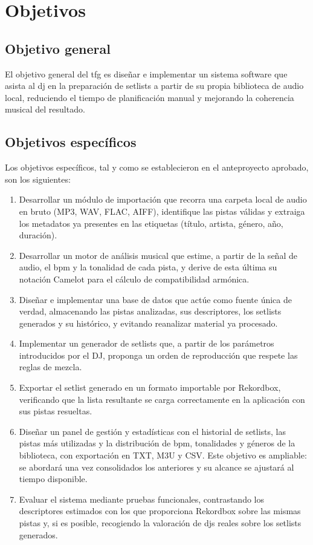 \section{Objetivos}
\label{sec:intro-objetivos}

\subsection{Objetivo general}

El objetivo general del \acs{tfg} es diseñar e implementar un sistema software que asista al \acs{dj} en la preparación de setlists a partir de su propia biblioteca de audio local, reduciendo el tiempo de planificación manual y mejorando la coherencia musical del resultado.

\subsection{Objetivos específicos}

Los objetivos específicos, tal y como se establecieron en el anteproyecto aprobado, son los siguientes:

\begin{enumerate}[label=\textbf{O\arabic*.}, leftmargin=*]
  \item Desarrollar un módulo de importación que recorra una carpeta local de audio en bruto (MP3, WAV, FLAC, AIFF), identifique las pistas válidas y extraiga los metadatos ya presentes en las etiquetas (título, artista, género, año, duración).
  \item Desarrollar un motor de análisis musical que estime, a partir de la señal de audio, el \acs{bpm} y la tonalidad de cada pista, y derive de esta última su notación Camelot para el cálculo de compatibilidad armónica.
  \item Diseñar e implementar una base de datos que actúe como fuente única de verdad, almacenando las pistas analizadas, sus descriptores, los setlists generados y su histórico, y evitando reanalizar material ya procesado.
  \item Implementar un generador de setlists que, a partir de los parámetros introducidos por el DJ, proponga un orden de reproducción que respete las reglas de mezcla.
  \item Exportar el setlist generado en un formato importable por Rekordbox, verificando que la lista resultante se carga correctamente en la aplicación con sus pistas resueltas.
  \item Diseñar un panel de gestión y estadísticas con el historial de setlists, las pistas más utilizadas y la distribución de \acs{bpm}, tonalidades y géneros de la biblioteca, con exportación en TXT, M3U y CSV. Este objetivo es ampliable: se abordará una vez consolidados los anteriores y su alcance se ajustará al tiempo disponible.
  \item Evaluar el sistema mediante pruebas funcionales, contrastando los descriptores estimados con los que proporciona Rekordbox sobre las mismas pistas y, si es posible, recogiendo la valoración de \acsp{dj} reales sobre los setlists generados.
\end{enumerate}

